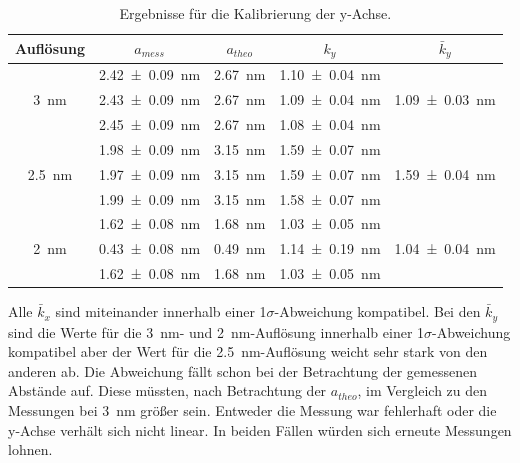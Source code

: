\begin{table}[H]
	\renewcommand{\arraystretch}{1.5}
	\centering
	\begin{tabular}{|c|c|c|c|c|}
		\hline
		Auflösung & $a_{mess}$ & $a_{theo}$ & $k_y$ & $\bar{k}_y$ \\
		\hline
		\multirow{3}{*}{\SI{3}{nm}} & \SI{2.42+-0.09}{nm} & \SI{2.67}{nm} & \SI{1.10+-0.04}{nm} & \multirow{3}{*}{\SI{1.09+-0.03}{nm}} \\
		 & \SI{2.43+-0.09}{nm} & \SI{2.67}{nm} & \SI{1.09+-0.04}{nm} & \\
		 & \SI{2.45+-0.09}{nm} & \SI{2.67}{nm} & \SI{1.08+-0.04}{nm} & \\
		\hline
		\multirow{3}{*}{\SI{2,5}{nm}} & \SI{1.98+-0.09}{nm} & \SI{3.15}{nm} & \SI{1.59+-0.07}{nm} & \multirow{3}{*}{\SI{1.59+-0.04}{nm}} \\
		 & \SI{1.97+-0.09}{nm} & \SI{3.15}{nm} & \SI{1.59+-0.07}{nm} & \\
		 & \SI{1.99+-0.09}{nm} & \SI{3.15}{nm} & \SI{1.58+-0.07}{nm} & \\
		\hline
		\multirow{3}{*}{\SI{2}{nm}} & \SI{1.62+-0.08}{nm} & \SI{1.68}{nm} & \SI{1.03+-0.05}{nm} & \multirow{3}{*}{\SI{1.04+-0.04}{nm}} \\
		 & \SI{0.43+-0.08}{nm} & \SI{0.49}{nm} & \SI{1.14+-0.19}{nm} & \\
		 & \SI{1.62+-0.08}{nm} & \SI{1.68}{nm} & \SI{1.03+-0.05}{nm} & \\
		\hline
	\end{tabular}
	\caption{Ergebnisse für die Kalibrierung der y-Achse.}
	\label{tab:calibY}
\end{table}

Alle $\bar{k}_x$ sind miteinander innerhalb einer 1$\sigma$-Abweichung kompatibel. Bei den $\bar{k}_y$ sind die Werte für die \SI{3}{nm}- und \SI{2}{nm}-Auflösung innerhalb einer 1$\sigma$-Abweichung kompatibel aber der Wert für die \SI{2,5}{nm}-Auflösung weicht sehr stark von den anderen ab. Die Abweichung fällt schon bei der Betrachtung der gemessenen Abstände auf. Diese müssten, nach Betrachtung der $a_{theo}$, im Vergleich zu den Messungen bei \SI{3}{nm} größer sein. Entweder die Messung war fehlerhaft oder die y-Achse verhält sich nicht linear. In beiden Fällen würden sich erneute Messungen lohnen.


